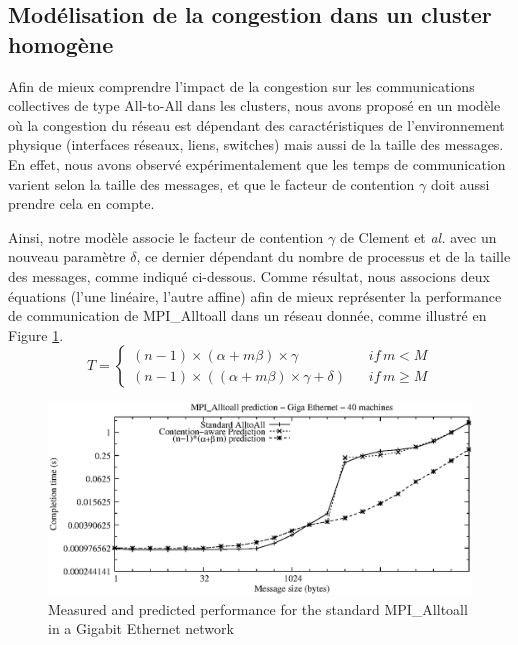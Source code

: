\subsection{Modélisation de la congestion dans un cluster homogène}

Afin de mieux comprendre l'impact de la congestion sur les communications collectives de type All-to-All dans les clusters, nous avons proposé en \cite{Steffenel06b} un modèle où la congestion du réseau est dépendant des caractéristiques de l'environnement physique (interfaces réseaux, liens, switches) mais aussi de la taille des messages. En effet, nous avons observé expérimentalement que les temps de communication varient selon la taille des messages,  et que le facteur de contention  $\gamma$ doit aussi prendre cela en compte. 

Ainsi, notre modèle associe le facteur de contention $\gamma$ de Clement et \textit{al.} \cite{Clement96} avec un nouveau paramètre $\delta$, ce dernier dépendant du nombre de processus et de la taille des messages, comme indiqué ci-dessous. Comme résultat, nous associons deux équations (l'une linéaire, l'autre affine) afin de mieux représenter la performance de communication de MPI\_Alltoall dans un réseau donnée, comme illustré en Figure \ref{Figure: local}.
\begin{equation}
T=\left\{ \begin{array}{lc}
(n-1)\times(\alpha+m\beta)\times\gamma & if\, m<M\\
(n-1)\times((\alpha+m\beta)\times\gamma+\delta)\,\,\,\,\, & if\, m\geq M\end{array}\right.\label{eq:6}\end{equation}

\begin{figure}
	\begin{center}\includegraphics[width=0.7\columnwidth]{images/newcomp24_pred_log}\end{center}
	\caption{\label{Figure: local}Measured and predicted performance for the standard MPI\_Alltoall in a Gigabit Ethernet network}
\end{figure}


